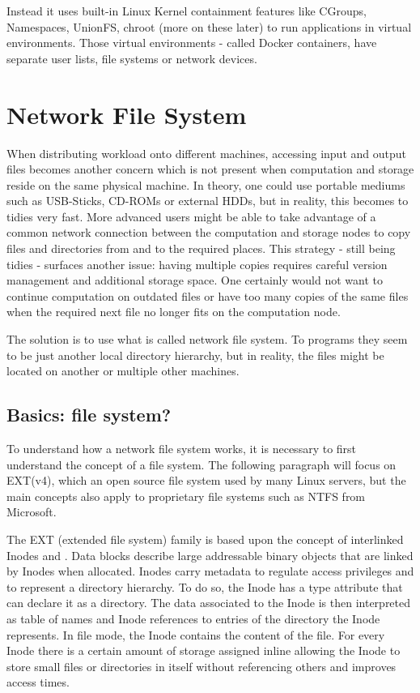 Instead it uses built-in Linux Kernel containment features like CGroups, Namespaces, UnionFS, chroot (more on these later) to run applications in virtual environments. Those virtual environments - called Docker containers, have separate user lists, file systems or network devices.

\section{Network File System}

When distributing workload onto different machines, accessing input and output files becomes another concern which is not present when computation and storage reside on the same physical machine.
In theory, one could use portable mediums such as USB-Sticks, CD-ROMs or external HDDs, but in reality, this becomes to tidies very fast.
More advanced users might be able to take advantage of a common network connection between the computation and storage nodes to copy files and directories from and to the required places.
This strategy - still being tidies - surfaces another issue: having multiple copies requires careful version management and additional storage space.
One certainly would not want to continue computation on outdated files or have too many copies of the same files when the required next file no longer fits on the computation node.

The solution is to use what is called network file system.
To programs they seem to be just another local directory hierarchy, but in reality, the files might be located on another or multiple other machines.

\subsection{Basics: file system?}

To understand how a network file system works, it is necessary to first understand the concept of a file system.
The following paragraph will focus on EXT(v4), which an open source file system used by many Linux servers, but the main concepts also apply to proprietary file systems such as NTFS from Microsoft.

The EXT (extended file system) family is based upon the concept of interlinked Inodes and .
Data blocks describe large addressable binary objects that are linked by Inodes when allocated.
Inodes carry metadata to regulate access privileges and to represent a directory hierarchy.
To do so, the Inode has a type attribute that can declare it as a directory.
The data associated to the Inode is then interpreted as table of names and Inode references to entries of the directory the Inode represents.
In file mode, the Inode contains the content of the file.
For every Inode there is a certain amount of storage assigned inline allowing the Inode to store small files or directories in itself without referencing others and improves access times.

